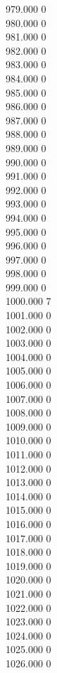 { 979.000	0 \\
 980.000	0 \\
 981.000	0 \\
 982.000	0 \\
 983.000	0 \\
 984.000	0 \\
 985.000	0 \\
 986.000	0 \\
 987.000	0 \\
 988.000	0 \\
 989.000	0 \\
 990.000	0 \\
 991.000	0 \\
 992.000	0 \\
 993.000	0 \\
 994.000	0 \\
 995.000	0 \\
 996.000	0 \\
 997.000	0 \\
 998.000	0 \\
 999.000	0 \\
 1000.000	7 \\
 1001.000	0 \\
 1002.000	0 \\
 1003.000	0 \\
 1004.000	0 \\
 1005.000	0 \\
 1006.000	0 \\
 1007.000	0 \\
 1008.000	0 \\
 1009.000	0 \\
 1010.000	0 \\
 1011.000	0 \\
 1012.000	0 \\
 1013.000	0 \\
 1014.000	0 \\
 1015.000	0 \\
 1016.000	0 \\
 1017.000	0 \\
 1018.000	0 \\
 1019.000	0 \\
 1020.000	0 \\
 1021.000	0 \\
 1022.000	0 \\
 1023.000	0 \\
 1024.000	0 \\
 1025.000	0 \\
 1026.000	0 \\
}
